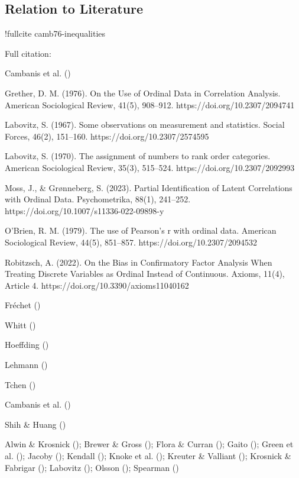\documentclass[
  12pt,
]{article}
\theoremstyle{plain}
\theoremstyle{definition}
\theoremstyle{remark}
\begin{document}
\subsection{Relation to Literature}\label{relation-to-literature}

!fullcite camb76-inequalities

Full citation:

{Cambanis et al. ()}

Grether, D. M. (1976). On the Use of Ordinal Data in Correlation
Analysis. American Sociological Review, 41(5), 908--912.
https://doi.org/10.2307/2094741

Labovitz, S. (1967). Some observations on measurement and statistics.
Social Forces, 46(2), 151--160. https://doi.org/10.2307/2574595

Labovitz, S. (1970). The assignment of numbers to rank order categories.
American Sociological Review, 35(3), 515--524.
https://doi.org/10.2307/2092993

Moss, J., \& Grønneberg, S. (2023). Partial Identification of Latent
Correlations with Ordinal Data. Psychometrika, 88(1), 241--252.
https://doi.org/10.1007/s11336-022-09898-y

O'Brien, R. M. (1979). The use of Pearson's r with ordinal data.
American Sociological Review, 44(5), 851--857.
https://doi.org/10.2307/2094532

Robitzsch, A. (2022). On the Bias in Confirmatory Factor Analysis When
Treating Discrete Variables as Ordinal Instead of Continuous. Axioms,
11(4), Article 4. https://doi.org/10.3390/axioms11040162

Fréchet ()

Whitt ()

Hoeffding ()

Lehmann ()

Tchen ()

Cambanis et al. ()

Shih \& Huang ()

Alwin \& Krosnick (); Brewer \&
Gross (); Flora \& Curran
(); Gaito
(); Green et al.
(); Jacoby
(); Kendall
(); Knoke et al.
(); Kreuter \& Valliant
(); Krosnick \& Fabrigar
(); Labovitz
(); Olsson
(); Spearman
()
\end{document}
